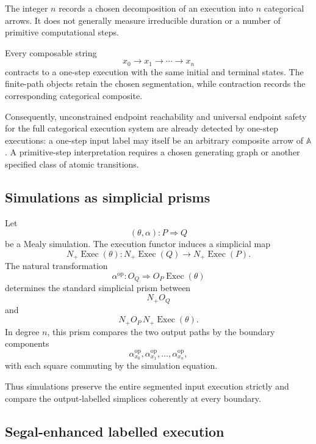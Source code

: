 \begin{remark}
\label{rem:path-length-segmentation}
The integer \(n\) records a chosen decomposition of an execution into
\(n\) categorical arrows. It does not generally measure irreducible
duration or a number of primitive computational steps.

Every composable string
\[
    x_0\to x_1\to\cdots\to x_n
\]
contracts to a one-step execution with the same initial and terminal states.
The finite-path objects retain the chosen segmentation, while contraction
records the corresponding categorical composite.

Consequently, unconstrained endpoint reachability and universal endpoint
safety for the full categorical execution system are already detected by
one-step executions: a one-step input label may itself be an arbitrary
composite arrow of \(\mathbb A\). A primitive-step interpretation requires
a chosen generating graph or another specified class of atomic transitions.
\end{remark}

\subsection{Simulations as simplicial prisms}
\label{subsec:simulations-simplicial-prisms}

Let
\[
    (\theta,\alpha):P\Longrightarrow Q
\]
be a Mealy simulation. The execution functor induces a simplicial map
\[
    N_+\operatorname{Exec}(\theta):
    N_+\operatorname{Exec}(Q)
    \longrightarrow
    N_+\operatorname{Exec}(P).
\]
The natural transformation
\[
    \alpha^{\mathrm{op}}:
    O_Q\Longrightarrow O_P\operatorname{Exec}(\theta)
\]
determines the standard simplicial prism between
\[
    N_+O_Q
\]
and
\[
    N_+O_P\,N_+\operatorname{Exec}(\theta).
\]
In degree \(n\), this prism compares the two output paths by the boundary
components
\[
    \alpha_{x_0}^{\mathrm{op}},
    \alpha_{x_1}^{\mathrm{op}},
    \ldots,
    \alpha_{x_n}^{\mathrm{op}},
\]
with each square commuting by the simulation equation.

Thus simulations preserve the entire segmented input execution strictly and
compare the output-labelled simplices coherently at every boundary.

\subsection{Segal-enhanced labelled execution}
\label{subsec:segal-enhanced-labelled-execution}

